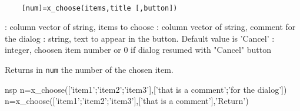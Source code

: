 
\begin{mandesc}
  \\ %
\end{mandesc}
\begin{calling_sequence}
  \begin{verbatim}
    [num]=x_choose(items,title [,button])   
  \end{verbatim}
\end{calling_sequence}
\begin{parameters}
  \begin{varlist}
    : column vector of string,  items to choose
    : column vector of string, comment for the dialog
    :  string, text to appear in the button. Default value is 'Cancel'
    : integer, choosen item number or 0 if dialog resumed with "Cancel" button
  \end{varlist}
\end{parameters}
\begin{mandescription}
  Returns in \verb!num! the number of the chosen item.
\end{mandescription}

\begin{examples}
  \begin{mintednsp}{nsp}
    n=x_choose(['item1';'item2';'item3'],['that is a comment';'for the dialog'])
    n=x_choose(['item1';'item2';'item3'],['that is a comment'],'Return')
  \end{mintednsp}
\end{examples}
\begin{manseealso}
\end{manseealso}

